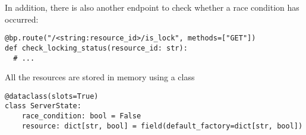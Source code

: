 In addition, there is also another endpoint to check whether a race condition 
has occurred:

\begin{listing}[!ht]
  \begin{verbatim}
@bp.route("/<string:resource_id>/is_lock", methods=["GET"])
def check_locking_status(resource_id: str):
  # ...
  \end{verbatim}
\end{listing}

All the resources are stored in memory using a class 

\begin{listing}[!ht]
  \begin{verbatim}
@dataclass(slots=True)
class ServerState:
    race_condition: bool = False
    resource: dict[str, bool] = field(default_factory=dict[str, bool])
  \end{verbatim}
\end{listing}


